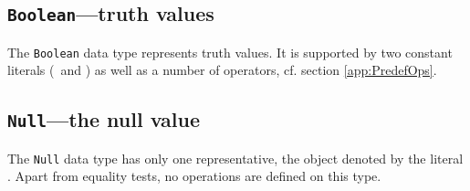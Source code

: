 

\subsection{{\tt Boolean}---truth values}\label{sect:Booleans}


The {\tt Boolean} data type represents truth values. It is supported
by two constant literals (\kwTrue ~and \kwFalse) as well as a number
of operators, cf. section \ref{app:PredefOps}.




\subsection{{\tt Null}---the null value}\label{sect:Null}


The {\tt Null} data type has only one representative, the object
denoted by the literal \kwNull. Apart from equality tests, no
operations are defined on this type.














